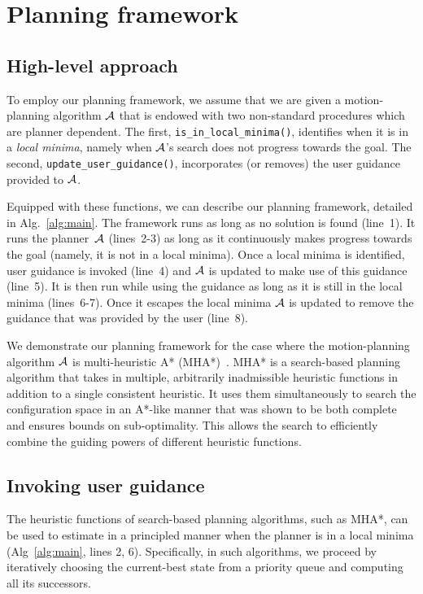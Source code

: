 \documentclass[conference]{IEEEtran}
\begin{document}
\section{Planning framework}
\label{sec:planning}
\subsection{High-level approach}
\label{sec:high}
To employ our planning framework, we assume that we are given a motion-planning algorithm $\mathcal{A}$ that is endowed with two non-standard procedures which are planner dependent.
The first, \texttt{is\_in\_local\_minima()}, 
identifies when it is in a \emph{local minima}, namely when $\mathcal{A}$'s search does not progress towards the goal. 
The second, \texttt{update\_user\_guidance()}, 
incorporates (or removes) the user guidance provided to $\mathcal{A}$. 

Equipped with these functions, we can describe our planning framework, detailed in Alg.~\ref{alg:main}.
The framework runs as long as no solution is found (line~1).
It runs the planner~$\mathcal{A}$ (lines~2-3) as long as it continuously makes progress towards the goal (namely, it is not in a local minima).
Once a local minima is identified, user guidance is invoked (line~4) and $\mathcal{A}$  is updated to make use of this guidance (line~5).
It is then run while using the guidance as long as it is still in the local minima (lines~6-7).
Once it escapes the local minima $\mathcal{A}$ is updated to remove the guidance that was provided by the user (line~8).


We demonstrate our planning framework for the case where the motion-planning algorithm $\mathcal{A}$ is multi-heuristic A* (MHA*)~\cite{ASNHL16}.
MHA* is a search-based planning algorithm that takes in multiple, arbitrarily inadmissible heuristic functions in addition to a single consistent heuristic.
It uses them simultaneously to search the configuration space in an A*-like manner that was shown to be both complete and ensures bounds on sub-optimality. 
This allows the search to efficiently combine the guiding powers of different heuristic functions. 


\subsection{Invoking user guidance}
\label{sec:q1}
The heuristic functions of search-based planning algorithms, such as MHA*, can be used to estimate in a principled manner when the planner is in a local minima (Alg~\ref{alg:main}, lines 2, 6). 
Specifically, in such algorithms,  we proceed by iteratively choosing  the current-best state from a priority queue and computing all its successors. 
\end{document}
